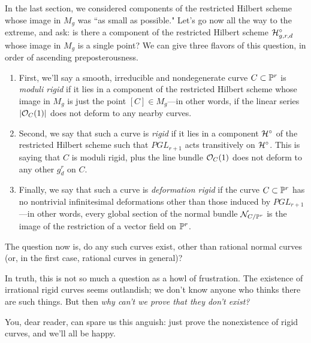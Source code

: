 In the last section, we considered components of the restricted Hilbert scheme whose image in $M_g$ was ``as small as possible." Let's go now all the way to the extreme, and ask: is there a component of the restricted Hilbert scheme $\cH^\circ_{g,r,d}$ whose image in $M_g$ is a single point? We can give three flavors of this question, in order of ascending preposterousness.

\begin{enumerate} 
\item First, we'll say a smooth, irreducible and nondegenerate curve $C \subset \PP^r$ is \emph{moduli rigid} if it lies in a component of the restricted Hilbert scheme whose image in $M_g$ is just the point $[C] \in M_g$---in other words, if the linear series $|\cO_C(1)|$ does not deform to any nearby curves.

\item Second, we say that such a curve is \emph{rigid} if it lies in a component $\cH^\circ$ of the restricted Hilbert scheme such that $PGL_{r+1}$ acts transitively on $\cH^\circ$. This is saying that $C$ is moduli rigid, plus the line bundle $\cO_C(1)$ does not deform to any other $g^r_d$ on $C$.

\item Finally, we say that such a curve is \emph{deformation rigid} if the curve $C \subset \PP^r$ has no nontrivial infinitesimal deformations other than those induced by $PGL_{r+1}$---in other words, every global section of the normal bundle $\cN_{C/\PP^r}$ is the image of the restriction of a vector field on $\PP^r$.
\end{enumerate}

The question now is, do any such curves exist, other than rational normal curves (or, in the first  case, rational curves in general)?

In truth, this is not so much a question as a howl of frustration. The existence of irrational rigid curves seems outlandish; we don't know anyone who thinks there are such things. But then \emph{why can't we prove that they don't exist?} 

You, dear reader, can spare us this anguish: just prove the nonexistence of rigid curves, and we'll all be happy.

